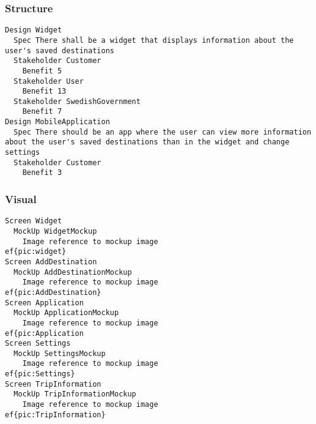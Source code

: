 \begin{lstlisting}

\end{lstlisting}


       \subsubsection{Structure}


\begin{lstlisting}
Design Widget
  Spec There shall be a widget that displays information about the user's saved destinations
  Stakeholder Customer
    Benefit 5
  Stakeholder User
    Benefit 13
  Stakeholder SwedishGovernment
    Benefit 7
Design MobileApplication
  Spec There should be an app where the user can view more information about the user's saved destinations than in the widget and change settings
  Stakeholder Customer
    Benefit 3

\end{lstlisting}
    
        
       \subsubsection{Visual}


\begin{lstlisting}
Screen Widget
  MockUp WidgetMockup
    Image reference to mockup image 
ef{pic:widget}
Screen AddDestination
  MockUp AddDestinationMockup
    Image reference to mockup image 
ef{pic:AddDestination}
Screen Application
  MockUp ApplicationMockup
    Image reference to mockup image 
ef{pic:Application
Screen Settings
  MockUp SettingsMockup
    Image reference to mockup image 
ef{pic:Settings}
Screen TripInformation
  MockUp TripInformationMockup
    Image reference to mockup image 
ef{pic:TripInformation}

\end{lstlisting}